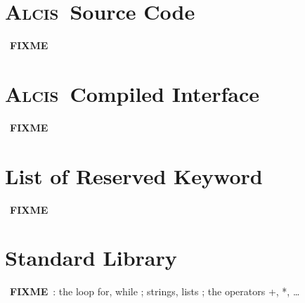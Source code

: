 \documentclass{article}
\newcommand{\Alcis}{\textsc{Alcis}~}
\newcommand{\FIXME}{~\textbf{FIXME}~}
\begin{document}
\section{\Alcis Source Code}

\FIXME

\section{\Alcis Compiled Interface}

\FIXME

\section{List of Reserved Keyword}

\FIXME

\section{Standard Library}

\FIXME: the loop for, while ; strings, lists ; the operators +, *, \ldots
\end{document}
